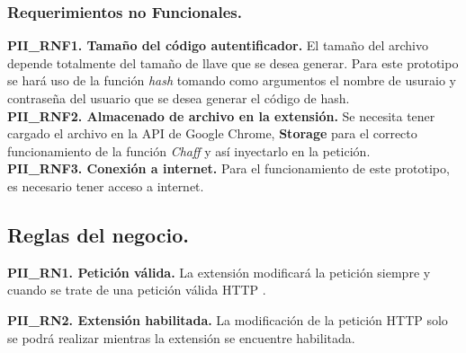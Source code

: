 \documentclass[12pt, a4paper, titlepage]{report}
\begin{document}
{                %
                
                
		        }
				
				\subsubsection{Requerimientos no Funcionales.}
				{\setlength{\parindent}{12pt}
				
				\textbf{PII\_RNF1. Tamaño del código autentificador.} El tamaño del archivo depende totalmente del tamaño de llave que se desea generar. Para este prototipo se hará uso de la función \textit{hash} tomando como argumentos el nombre de usuraio y contraseña del usuario que se desea generar el código de hash.\\
				
				\textbf{PII\_RNF2. Almacenado de archivo en la extensión.} Se necesita tener cargado el archivo en la API de Google Chrome, \textbf{Storage} para el correcto funcionamiento de la función \textit{Chaff} y así inyectarlo en la petición. \\
				
				\textbf{PII\_RNF3. Conexión a internet.} Para el funcionamiento de este prototipo, es necesario tener acceso a internet. \\
				
				}
		    
		    \subsection{Reglas del negocio.}
		        
            \textbf{PII\_RN1. Petición válida.} La extensión modificará la petición siempre y cuando se trate de una petición válida HTTP .\\
            \label{PII_RN1}
            
            \textbf{PII\_RN2. Extensión habilitada.} La modificación de la petición HTTP solo se podrá realizar mientras la extensión se encuentre habilitada.\\
            \label{PII_RN2}
            
\end{document}
